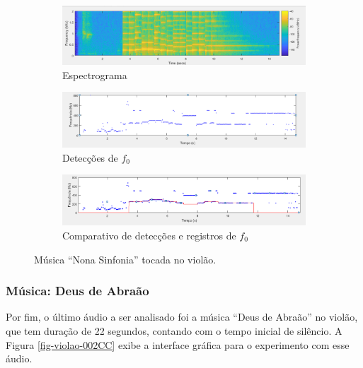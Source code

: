 \begin{figure}
	
	\begin{subfigure}{1\textwidth}
		\includegraphics[width=\linewidth]{pasta1_figuras/violao-nona-2.png}
		\caption{Espectrograma}
		\label{fig-violao-nona-2}
	\end{subfigure}
	\hspace*{\fill} %
	\begin{subfigure}{1\textwidth}
		\includegraphics[width=\linewidth]{pasta1_figuras/violao-nona-3.png}
		\caption{Detecções de $f_0$}
		\label{fig-violao-nona-3}
	\end{subfigure}
	\hspace*{\fill} %
	\begin{subfigure}{1\textwidth}
		\includegraphics[width=\linewidth]{pasta1_figuras/violao-nona-4.png}
		\caption{Comparativo de detecções e registros de $f_0$}
		\label{fig-violao-nona-4}
	\end{subfigure}
		\caption{Música ``Nona Sinfonia'' tocada no violão.}
\end{figure}

\subsubsection{Música: Deus de Abraão}

Por fim, o último áudio a ser analisado foi a música ``Deus de Abraão'' no violão, que tem duração de 22 segundos, contando com o tempo inicial de silêncio. A Figura \ref{fig-violao-002CC} exibe a interface gráfica para o experimento com esse áudio.

